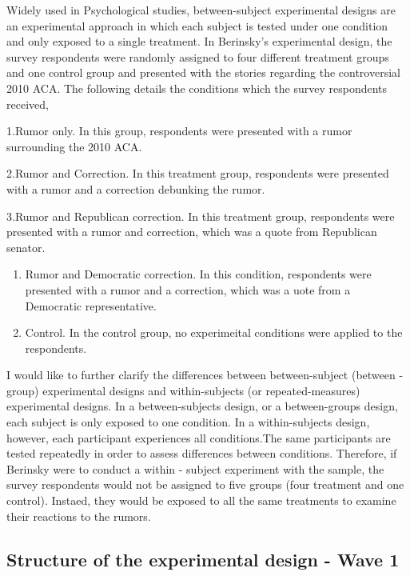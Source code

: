 \documentclass[AER]{AEA}
\begin{document}
Widely used in Psychological studies, between-subject experimental
designs are an experimental approach in which each subject is tested
under one condition and only exposed to a single treatment. In
Berinsky's experimental design, the survey respondents were randomly
assigned to four different treatment groups and one control group and
presented with the stories regarding the controversial 2010 ACA. The
following details the conditions which the survey respondents received,

1.Rumor only. In this group, respondents were presented with a rumor
surrounding the 2010 ACA.

2.Rumor and Correction. In this treatment group, respondents were
presented with a rumor and a correction debunking the rumor.

3.Rumor and Republican correction. In this treatment group, respondents
were presented with a rumor and correction, which was a quote from
Republican senator.

\begin{enumerate}
\def\labelenumi{\arabic{enumi}.}
\setcounter{enumi}{3}
\item
  Rumor and Democratic correction. In this condition, respondents were
  presented with a rumor and a correction, which was a uote from a
  Democratic representative.
\item
  Control. In the control group, no experimeital conditions were applied
  to the respondents.
\end{enumerate}

I would like to further clarify the differences between between-subject
(between - group) experimental designs and within-subjects (or
repeated-measures) experimental designs. In a between-subjects design,
or a between-groups design, each subject is only exposed to one
condition. In a within-subjects design, however, each participant
experiences all conditions.The same participants are tested repeatedly
in order to assess differences between conditions. Therefore, if
Berinsky were to conduct a within - subject experiment with the sample,
the survey respondents would not be assigned to five groups (four
treatment and one control). Instaed, they would be exposed to all the
same treatments to examine their reactions to the rumors.

\subsection{Structure of the experimental design  - Wave 1}
\end{document}
